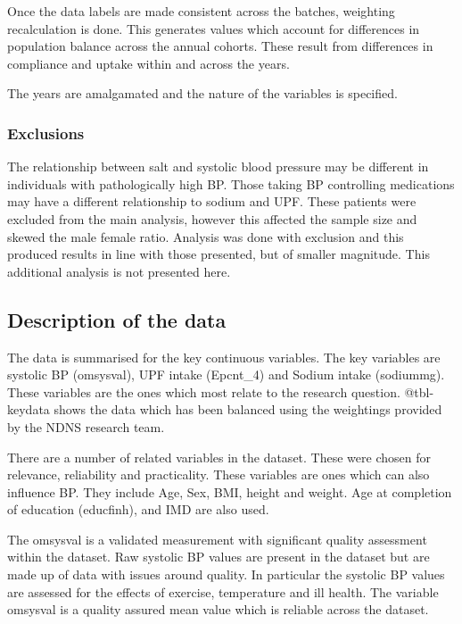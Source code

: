 \documentclass[
]{article}
\begin{document}
Once the data labels are made consistent across the batches, weighting
recalculation is done. This generates values which account for
differences in population balance across the annual cohorts. These
result from differences in compliance and uptake within and across the
years.

The years are amalgamated and the nature of the variables is specified.

\hypertarget{exclusions}{%
\subsubsection{Exclusions}\label{exclusions}}

The relationship between salt and systolic blood pressure may be
different in individuals with pathologically high BP. Those taking BP
controlling medications may have a different relationship to sodium and
UPF. These patients were excluded from the main analysis, however this
affected the sample size and skewed the male female ratio. Analysis was
done with exclusion and this produced results in line with those
presented, but of smaller magnitude. This additional analysis is not
presented here.

\hypertarget{description-of-the-data}{%
\subsection{Description of the data}\label{description-of-the-data}}

The data is summarised for the key continuous variables. The key
variables are systolic BP (omsysval), UPF intake (Epcnt\_4) and Sodium
intake (sodiummg). These variables are the ones which most relate to the
research question. @tbl-keydata shows the data which has been balanced
using the weightings provided by the NDNS research team.

There are a number of related variables in the dataset. These were
chosen for relevance, reliability and practicality. These variables are
ones which can also influence BP. They include Age, Sex, BMI, height and
weight. Age at completion of education (educfinh), and IMD are also
used.

The omsysval is a validated measurement with significant quality
assessment within the dataset. Raw systolic BP values are present in the
dataset but are made up of data with issues around quality. In
particular the systolic BP values are assessed for the effects of
exercise, temperature and ill health. The variable omsysval is a quality
assured mean value which is reliable across the dataset.
\end{document}
